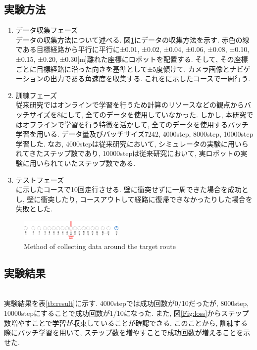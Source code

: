\documentclass[10pt]{ujarticle}
\begin{document}
    \subsection{実験方法}
    \begin{enumerate}
        \item{データ収集フェーズ}\mbox{}\\データの収集方法について述べる. 図\ref{Fig:collect-data}にデータの収集方法を示す. 赤色の線である目標経路から平行に平行に±0.01, ±0.02, ±0.04, ±0.06, ±0.08, ±0.10, ±0.15, ±0.20, ±0.30[m]離れた座標にロボットを配置する. そして, その座標ごとに目標経路に沿った向きを基準として±5度傾けて, カメラ画像とナビゲーションの出力である角速度を収集する. これをに示したコースで一周行う. 
        \item{訓練フェーズ}\mbox{}\\従来研究ではオンラインで学習を行うため計算のリソースなどの観点からバッチサイズを8にして, 全てのデータを使用していなかった. しかし, 本研究ではオフラインで学習を行う特徴を活かして, 全てのデータを使用するバッチ学習を用いる. データ量及びバッチサイズ7242, 4000step, 8000step, 10000step学習した. なお, 4000stepは従来研究において, シミュレータの実験に用いられてきたステップ数であり, 10000stepは従来研究において, 実ロボットの実験に用いられていたステップ数である. 
        \item{テストフェーズ}\mbox{}\\に示したコースで10回走行させる. 壁に衝突せずに一周できた場合を成功とし, 壁に衝突したり, コースアウトして経路に復帰できなかったりした場合を失敗とした. 
    \end{enumerate}

    \begin{figure}[h]
        \centering
        \includegraphics[width=0.45\textwidth]{fig/collect-data.png}
        \caption{Method of collecting data around the target route}
        \label{Fig:collect-data}
    \end{figure}

    \subsection{実験結果}\mbox{}\\
    実験結果を表\ref{tb:result}に示す. 4000stepでは成功回数が0/10だったが, 8000step, 10000stepにすることで成功回数が1/10になった. また, 図\ref{Fig:loss}からステップ数増やすことで学習が収束していることが確認できる. このことから, 訓練する際にバッチ学習を用いて, ステップ数を増やすことで成功回数が増えることを示せた. 
\end{document}
